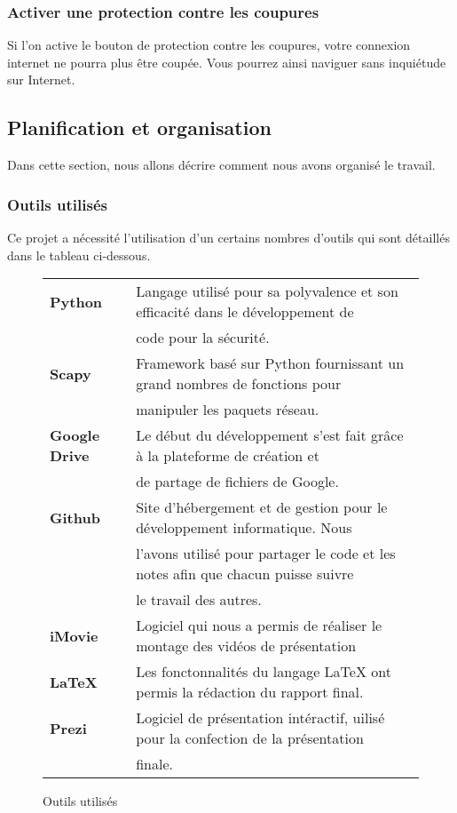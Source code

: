 \documentclass[11pt]{article}
\begin{document}
\subsubsection{Activer une protection contre les coupures}
Si l'on active le bouton de protection contre les coupures, votre connexion internet ne pourra plus être coupée. Vous pourrez ainsi naviguer sans inquiétude sur Internet.




\subsection{Planification et organisation}
Dans cette section, nous allons décrire comment nous avons organisé le travail.

\subsubsection{Outils utilisés}
Ce projet a nécessité l'utilisation d'un certains nombres d'outils qui sont détaillés dans le tableau ci-dessous.~\\
\begin{figure}[h]
\centering
\begin{tabular}{|l|l|}
\hline
   \textbf{Python} & Langage utilisé pour sa polyvalence et son efficacité dans le développement de  \\
    &code pour la sécurité. \\ \hline
    \textbf{Scapy} & Framework basé sur Python fournissant un grand nombres de fonctions pour  \\
    & manipuler les paquets réseau. \\ \hline
   \textbf{Google Drive} & Le début du développement s'est fait grâce à la plateforme de création et  \\
	& de partage de fichiers de Google. \\ \hline
\textbf{Github} & Site d'hébergement et de gestion pour le développement informatique. Nous \\ 
&   l'avons utilisé pour partager le code et les notes afin que chacun puisse suivre   \\
&  le travail des autres. \\ \hline
\textbf{iMovie} & Logiciel qui nous a permis de réaliser le montage des vidéos de présentation \\ \hline
\textbf{LaTeX} & Les fonctonnalités du langage LaTeX ont permis la rédaction du rapport final. \\ \hline
\textbf{Prezi} & Logiciel de présentation intéractif, uilisé pour la confection de la présentation \\
& finale.\\ \hline
\end{tabular}
\caption{Outils utilisés}
\end{figure}
\end{document}
